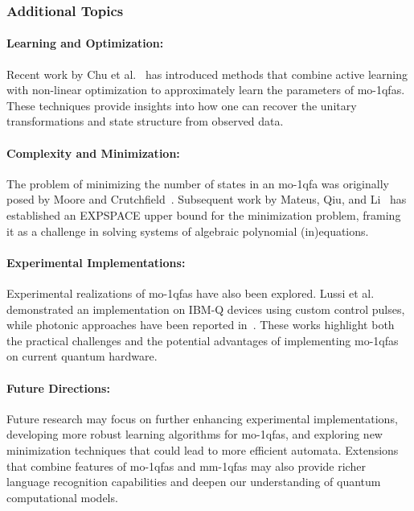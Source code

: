 \subsubsection{Additional Topics}
\paragraph{Learning and Optimization:} Recent work by Chu et al.~\cite{10.1007/978-3-031-35257-7_16} has introduced methods that combine active learning with non-linear optimization to approximately learn the parameters of \gls{mo-1qfa}s. These techniques provide insights into how one can recover the unitary transformations and state structure from observed data.

\paragraph{Complexity and Minimization:} The problem of minimizing the number of states in an \gls{mo-1qfa} was originally posed by Moore and Crutchfield~\cite{moore2000quantum}. Subsequent work by Mateus, Qiu, and Li~\cite{MATEUS201236} has established an EXPSPACE upper bound for the minimization problem, framing it as a challenge in solving systems of algebraic polynomial (in)equations.

\paragraph{Experimental Implementations:} Experimental realizations of \gls{mo-1qfa}s have also been explored. Lussi et al.~\cite{lussi2024implementingquantumfiniteautomaton} demonstrated an implementation on IBM-Q devices using custom control pulses, while photonic approaches have been reported in~\cite{app11188768}. These works highlight both the practical challenges and the potential advantages of implementing \gls{mo-1qfa}s on current quantum hardware.

\paragraph{Future Directions:} Future research may focus on further enhancing experimental implementations, developing more robust learning algorithms for \gls{mo-1qfa}s, and exploring new minimization techniques that could lead to more efficient automata. Extensions that combine features of \gls{mo-1qfa}s and \gls{mm-1qfa}s may also provide richer language recognition capabilities and deepen our understanding of quantum computational models.

